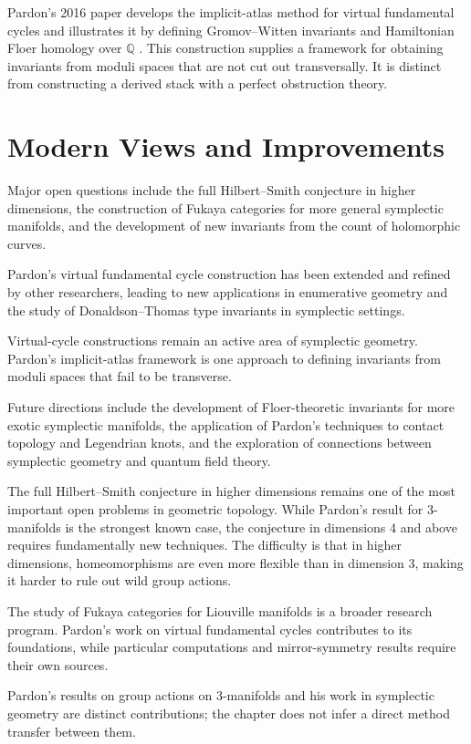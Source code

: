 Pardon's 2016 paper develops the implicit-atlas method for virtual fundamental cycles and illustrates it by defining Gromov--Witten invariants and Hamiltonian Floer homology over $\mathbb{Q}$ \cite{pardon2016}. This construction supplies a framework for obtaining invariants from moduli spaces that are not cut out transversally. It is distinct from constructing a derived stack with a perfect obstruction theory.

\section{Modern Views and Improvements}

Major open questions include the full Hilbert--Smith conjecture in higher dimensions, the construction of Fukaya categories for more general symplectic manifolds, and the development of new invariants from the count of holomorphic curves.

Pardon's virtual fundamental cycle construction has been extended and refined by other researchers, leading to new applications in enumerative geometry and the study of Donaldson--Thomas type invariants in symplectic settings.

Virtual-cycle constructions remain an active area of symplectic geometry. Pardon's implicit-atlas framework is one approach to defining invariants from moduli spaces that fail to be transverse.

Future directions include the development of Floer-theoretic invariants for more exotic symplectic manifolds, the application of Pardon's techniques to contact topology and Legendrian knots, and the exploration of connections between symplectic geometry and quantum field theory.

The full Hilbert--Smith conjecture in higher dimensions remains one of the most important open problems in geometric topology. While Pardon's result for 3-manifolds is the strongest known case, the conjecture in dimensions 4 and above requires fundamentally new techniques. The difficulty is that in higher dimensions, homeomorphisms are even more flexible than in dimension 3, making it harder to rule out wild group actions.

The study of Fukaya categories for Liouville manifolds is a broader research program. Pardon’s work on virtual fundamental cycles contributes to its foundations, while particular computations and mirror-symmetry results require their own sources.

Pardon's results on group actions on 3-manifolds and his work in symplectic geometry are distinct contributions; the chapter does not infer a direct method transfer between them.

